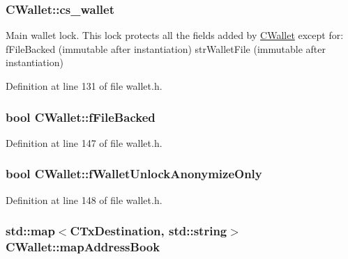 \subsubsection[{cs\+\_\+wallet}]{ C\+Wallet\+::cs\+\_\+wallet\hspace{0.3cm}{\ttfamily [mutable]}}\label{class_c_wallet_a4e6eb889f7638ed9695fdc0731581428}
Main wallet lock. This lock protects all the fields added by \hyperlink{class_c_wallet}{C\+Wallet} except for\+: f\+File\+Backed (immutable after instantiation) str\+Wallet\+File (immutable after instantiation) 

Definition at line 131 of file wallet.\+h.

\hypertarget{class_c_wallet_a1b2e285b4d7bd105c792941aa666249c}{}
\subsubsection[{f\+File\+Backed}]{\setlength{\rightskip}{0pt plus 5cm}bool C\+Wallet\+::f\+File\+Backed}\label{class_c_wallet_a1b2e285b4d7bd105c792941aa666249c}


Definition at line 147 of file wallet.\+h.

\hypertarget{class_c_wallet_add6767b414d652fc4acad99f4999d670}{}
\subsubsection[{f\+Wallet\+Unlock\+Anonymize\+Only}]{\setlength{\rightskip}{0pt plus 5cm}bool C\+Wallet\+::f\+Wallet\+Unlock\+Anonymize\+Only}\label{class_c_wallet_add6767b414d652fc4acad99f4999d670}


Definition at line 148 of file wallet.\+h.

\hypertarget{class_c_wallet_afed31f2489c987e0f76233121ed84ab7}{}
\subsubsection[{map\+Address\+Book}]{\setlength{\rightskip}{0pt plus 5cm}std\+::map$<${\bf C\+Tx\+Destination}, std\+::string$>$ C\+Wallet\+::map\+Address\+Book}\label{class_c_wallet_afed31f2489c987e0f76233121ed84ab7}


